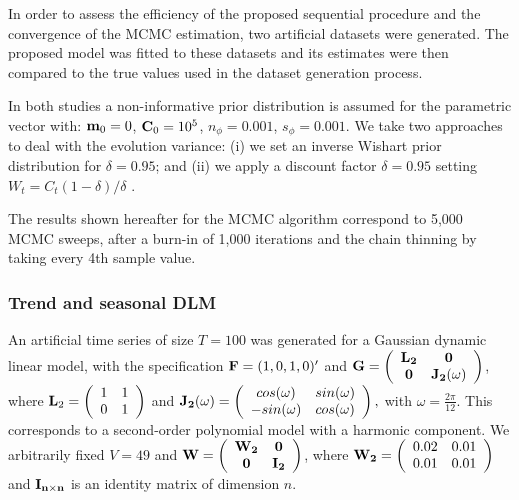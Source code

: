 \documentclass[12pt,a4paper]{article}\usepackage[]{graphicx}\usepackage[]{color}\usepackage{subfigure}
\begin{document}
In order to assess the efficiency of the proposed sequential procedure and the convergence of the MCMC estimation, two artificial datasets were generated.
The proposed model was fitted  to these datasets and its estimates were then compared to the true values used in the dataset generation process. 

In both studies a non-informative prior distribution is assumed for the parametric vector with: ${\bf m}_0 = 0$, ${\bf C}_0 = 10^5$, $n_\phi = 0.001$, 
$s_\phi = 0.001$. We take two approaches to deal with the evolution variance: (i) we set an inverse Wishart prior distribution for $\delta=0.95$; and (ii) we apply a discount factor $\delta = 0.95$ setting $W_t = C_t (1 - \delta)/\delta$ \cite[p. 51]{west1997}.

The results shown hereafter for the MCMC algorithm correspond to 5,000 MCMC sweeps, after a burn-in of 1,000 iterations and the chain thinning by taking every 4th sample value.

\subsubsection{Trend and seasonal DLM}\label{sec:trend_sas}
An artificial time series of size $T=100$ was generated for a Gaussian dynamic linear model, with the specification ${\bf F}=(1,0,1,0)'$ and ${\bf G}=\left( \begin{array}{c c} 
 {\bf L_2}& {\bf 0}\\ 
 {\bf 0} & {\bf J_2}(\omega)
  \end{array} \right)$, where ${\bf L}_2=\left( \begin{array}{c c} 
 1 & 1\\ 
 0 & 1\end{array} \right)$ and
 ${\bf J_2}(\omega)=\left( \begin{array}{c c} cos(\omega) &  sin(\omega)\\-sin(\omega) & cos(\omega) \end{array} \right),$
  with $\omega = \frac{2\pi}{12}$.
This corresponds to  a second-order polynomial model with a harmonic component. We arbitrarily fixed $V=49$ and 
${\bf W}=\left( \begin{array}{c c}{\bf W_2} & {\bf 0}\\ 
{\bf 0} & {\bf I_2}\end{array} \right)$, where ${\bf W_2}=\left( \begin{array}{c c}  0.02 & 0.01\\ 
0.01 & 0.01\end{array} \right)$  and ${\bf I_{n\times n}}$ is an identity matrix of dimension $n$. 
\end{document}
